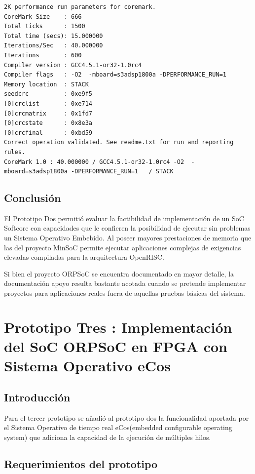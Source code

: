 \newpage
\begin{lstlisting}[frame=single,caption={Salida de la terminal serie de los resultados de la ejecución del benchmark},label={lst:rescrm},breaklines]
2K performance run parameters for coremark.
CoreMark Size    : 666
Total ticks      : 1500
Total time (secs): 15.000000
Iterations/Sec   : 40.000000
Iterations       : 600
Compiler version : GCC4.5.1-or32-1.0rc4
Compiler flags   : -O2  -mboard=s3adsp1800a -DPERFORMANCE_RUN=1  
Memory location  : STACK
seedcrc          : 0xe9f5
[0]crclist       : 0xe714
[0]crcmatrix     : 0x1fd7
[0]crcstate      : 0x8e3a
[0]crcfinal      : 0xbd59
Correct operation validated. See readme.txt for run and reporting rules.
CoreMark 1.0 : 40.000000 / GCC4.5.1-or32-1.0rc4 -O2  -mboard=s3adsp1800a -DPERFORMANCE_RUN=1   / STACK
\end{lstlisting}

		\section{Conclusión}
		El Prototipo Dos permitió evaluar la factibilidad de implementación de un SoC Softcore con capacidades que le confieren la posibilidad de ejecutar
		sin problemas un Sistema Operativo Embebido. Al poseer mayores prestaciones de memoria que las del proyecto MinSoC permite ejecutar aplicaciones
		complejas de exigencias elevadas compiladas para la arquitectura OpenRISC. 
		 
		Si bien el proyecto ORPSoC se encuentra documentado en mayor detalle, la documentación apoyo resulta bastante acotada cuando se pretende implementar
		proyectos para aplicaciones reales fuera de aquellas pruebas básicas del sistema. 		


\newpage
\chapter{Prototipo Tres : Implementación del SoC ORPSoC en FPGA con Sistema Operativo eCos}
		\section{Introducción}

		Para el tercer prototipo se añadió al prototipo dos la funcionalidad aportada por el Sistema Operativo de tiempo real eCos(embedded configurable operating system) que adiciona la capacidad de la ejecución de múltiples hilos. 


		\section{Requerimientos del prototipo}
		

